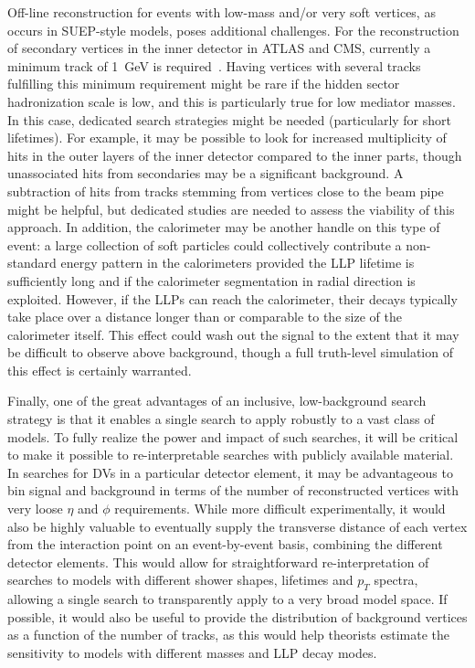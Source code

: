 Off-line reconstruction for events with low-mass and/or very soft vertices, as occurs in SUEP-style models, poses additional challenges. For the reconstruction of secondary vertices in the inner detector in ATLAS and CMS, currently a minimum track \pt of 1~GeV is required~\cite{Aaboud:2017iio,Chatrchyan:2012jua}. Having vertices with several tracks fulfilling this minimum \pt requirement might be rare if the hidden sector hadronization scale is low, and this is particularly true for low mediator masses. In this case, dedicated search strategies might be needed (particularly for short lifetimes). For example, it may be possible to look for increased multiplicity of hits in the outer layers of the inner detector compared to the inner parts, though unassociated hits from secondaries may be a significant background. A subtraction of hits from tracks stemming from vertices close to the beam pipe might be helpful, but dedicated studies are needed to assess the viability of this approach.
In addition, the calorimeter may be another handle on this type of event: a large collection of soft particles could collectively contribute a non-standard energy pattern in the calorimeters provided the LLP lifetime is sufficiently long and if the calorimeter segmentation in radial direction is exploited. However, if the LLPs can reach the calorimeter, their decays typically take place over a distance longer than or comparable to the size of the calorimeter itself. This effect could wash out the signal to the extent that it may be difficult to observe above background, though a full truth-level simulation of this effect is certainly warranted.

Finally, one of the great advantages of an inclusive, low-background search strategy is that it enables a single search to apply robustly to a vast class of models. To fully realize the power and impact of such searches, it will be critical to make it possible to re-interpretable searches with publicly available material. In searches for DVs in a particular detector element, it may be advantageous to bin signal and background in terms of the number of reconstructed vertices with very loose $\eta$ and $\phi$ requirements. While more difficult experimentally, it would also be highly valuable to eventually supply the transverse distance of each vertex from the interaction point on an event-by-event basis, combining the different detector elements. This would allow for straightforward re-interpretation of searches to models with different shower shapes, lifetimes and $p_T$ spectra, allowing a single search to transparently apply to a very broad model space. If possible, it would also be useful to provide the distribution of background vertices as a function of the number of tracks, as this would help theorists estimate the sensitivity to models with different masses and LLP decay modes. 

